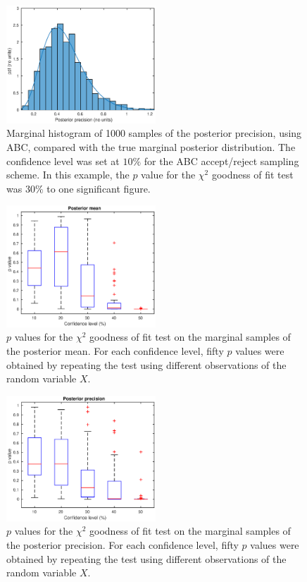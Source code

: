 \documentclass[a4paper]{proc}
\begin{document}
\begin{figure}
\includegraphics[width=0.5\textwidth]{precision.eps}
\caption{Marginal histogram of 1000 samples of the posterior precision, using ABC, compared with the true marginal posterior distribution. The confidence level was set at $10\%$ for the ABC accept/reject sampling scheme. In this example, the $p$ value for the $\chi^2$ goodness of fit test was $30\%$ to one significant figure.}
\label{precision}
\end{figure}

\begin{figure}
\includegraphics[width=0.5\textwidth]{pvalue_mean.eps}
\caption{$p$ values for the $\chi^2$ goodness of fit test on the marginal samples of the posterior mean. For each confidence level, fifty $p$ values were obtained by repeating the test using different observations of the random variable $X$.}
\label{pvalue_mean}
\end{figure}

\begin{figure}
\includegraphics[width=0.5\textwidth]{pvalue_precision.eps}
\caption{$p$ values for the $\chi^2$ goodness of fit test on the marginal samples of the posterior precision. For each confidence level, fifty $p$ values were obtained by repeating the test using different observations of the random variable $X$.}
\label{pvalue_precision}
\end{figure}
\end{document}
